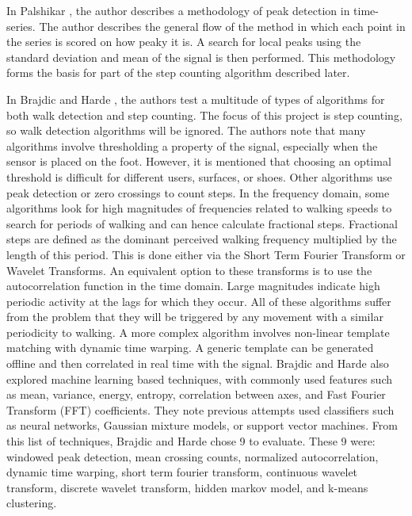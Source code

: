                 In Palshikar \cite{palshikar}, the author describes a methodology of peak detection in time-series. The author describes the general flow of the method in which each point in the series is scored on how peaky it is. A search for local peaks using the standard deviation and mean of the signal is then performed. This methodology forms the basis for part of the step counting algorithm described later.

                In Brajdic and Harde \cite{brajdic}, the authors test a multitude of types of algorithms for both walk detection and step counting. The focus of this project is step counting, so walk detection algorithms will be ignored. The authors note that many algorithms involve thresholding a property of the signal, especially when the sensor is placed on the foot. However, it is mentioned that choosing an optimal threshold is difficult for different users, surfaces, or shoes. Other algorithms use peak detection or zero crossings to count steps. In the frequency domain, some algorithms look for high magnitudes of frequencies related to walking speeds to search for periods of walking and can hence calculate fractional steps. Fractional steps are defined as the dominant perceived walking frequency multiplied by the length of this period. This is done either via the Short Term Fourier Transform or Wavelet Transforms. An equivalent option to these transforms is to use the autocorrelation function in the time domain. Large magnitudes indicate high periodic activity at the lags for which they occur. All of these algorithms suffer from the problem that they will be triggered by any movement with a similar periodicity to walking. A more complex algorithm involves non-linear template matching with dynamic time warping. A generic template can be generated offline and then correlated in real time with the signal. Brajdic and Harde \cite{brajdic} also explored machine learning based techniques, with commonly used features such as mean, variance, energy, entropy, correlation between axes, and Fast Fourier Transform (FFT) coefficients. They note previous attempts used classifiers such as neural networks, Gaussian mixture models, or support vector machines. From this list of techniques, Brajdic and Harde \cite{brajdic} chose 9 to evaluate. These 9 were: windowed peak detection, mean crossing counts, normalized autocorrelation, dynamic time warping, short term fourier transform, continuous wavelet transform, discrete wavelet transform, hidden markov model, and k-means clustering. 

